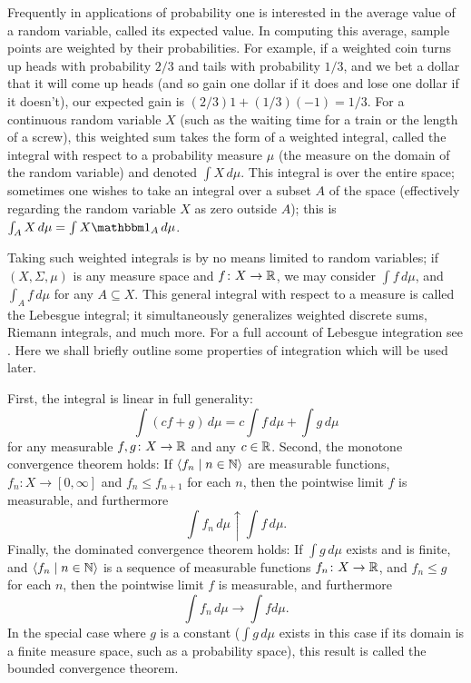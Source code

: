 \documentclass[leqno]{article}
\theoremstyle{definition}
\newcommand{\bldseq}[2]{\langle{#1}\mid{#2}\rangle}
\begin{document}
Frequently in applications of probability one is interested in the average value of a random variable, called its expected value. In computing this average, sample points are weighted by their probabilities. For example, if a weighted coin turns up heads with probability $2/3$ and tails with probability $1/3$, and we bet a dollar that it will come up heads (and so gain one dollar if it does and lose one dollar if it doesn't), our expected gain is $(2/3)1 + (1/3)(-1) = 1/3$. For a continuous random variable $X$ (such as the waiting time for a train or the length of a screw), this weighted sum takes the form of a weighted integral, called the integral with respect to a probability measure $\mu$ (the measure on the domain of the random variable) and denoted $\int X \, d\mu$. This integral is over the entire space; sometimes one wishes to take an integral over a subset $A$ of the space (effectively regarding the random variable $X$ as zero outside $A$); this is $\int_A X \, d\mu = \int X \mathbbm 1_A \, d\mu$.

Taking such weighted integrals is by no means limited to random variables; if $(X, \Sigma, \mu)$ is any measure space and $f\colon X \rightarrow \mathbb{R}$, we may consider $\int f \, d\mu$, and $\int_A f \, d\mu$ for any $A \subseteq X$. This general integral with respect to a measure is called the Lebesgue integral; it simultaneously generalizes weighted discrete sums, Riemann integrals, and much more. For a full account of Lebesgue integration see \cite{billingsley}. Here we shall briefly outline some properties of integration which will be used later.

First, the integral is linear in full generality:
\[ \int (cf + g) \, d\mu = c\int f \, d\mu + \int g \, d\mu \]
for any measurable $f,g\colon X \rightarrow \mathbb{R}$ and any $c \in \mathbb{R}$. Second, the monotone convergence theorem holds: If $\bldseq{f_n}{n \in \N}$ are measurable functions, $f_n\colon X \rightarrow [0,\infty]$ and $f_n \le f_{n+1}$ for each $n$, then the pointwise limit $f$ is measurable, and furthermore
\[ \int f_n \, d\mu \uparrow \int f \, d\mu. \]
Finally, the dominated convergence theorem holds: If $\int g \, d\mu$ exists and is finite, and $\bldseq{f_n}{n \in \N}$ is a sequence of measurable functions $f_n\colon X \rightarrow \mathbb{R}$, and $f_n \le g$ for each $n$, then the pointwise limit $f$ is measurable, and furthermore
\[ \int f_n \, d\mu \rightarrow \int f d\mu. \]
In the special case where $g$ is a constant ($\int g \, d\mu$ exists in this case if its domain is a finite measure space, such as a probability space), this result is called the bounded convergence theorem.
\end{document}
